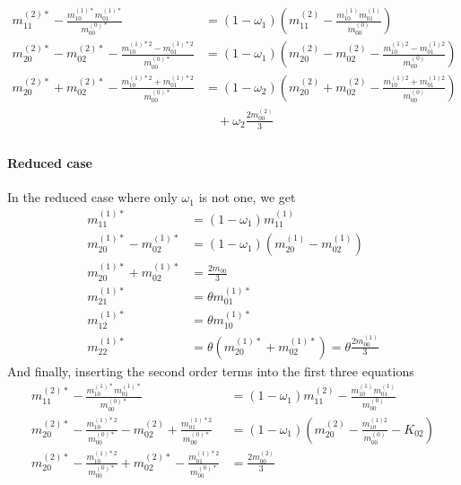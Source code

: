 \begin{equation}
  \begin{aligned}
    m_{11}^{(2)*} - \frac{ m_{10}^{(1)*}m_{01}^{(1)*}}{m_{00}^{(0)*}} & = (1-\omega_1)\left(m_{11}^{(2)} - \frac{ m_{10}^{(1)}m_{01}^{(1)}}{m_{00}^{(0)}}\right) \\
    m_{20}^{(2)*}-m_{02}^{(2)*} - \frac{ m_{10}^{(1)*2} - m_{01}^{(1)*2}}{m_{00}^{(0)*}} & = (1-\omega_1) \left(m_{20}^{(2)}-m_{02}^{(2)} - \frac{ m_{10}^{(1)2} - m_{01}^{(1)2}}{m_{00}^{(0)}}\right) \\
    m_{20}^{(2)*}+m_{02}^{(2)*} - \frac{ m_{10}^{(1)*2} + m_{01}^{(1)*2}}{m_{00}^{(0)*}} & = (1-\omega_2)
    \left(m_{20}^{(2)}+m_{02}^{(2)} - \frac{ m_{10}^{(1)2} + m_{01}^{(1)2}}{m_{00}^{(0)}}\right)
    \\&\quad
    + \omega_2 \frac{2 m_{00}^{(2)}}{3} \\
  \end{aligned}
\end{equation}

\paragraph{Reduced case}
\label{par:Reduced case}
In the reduced case where only $\omega_1$ is not one, we get
\begin{equation}
  \begin{aligned}
    m_{11}^{(1)*} & = (1-\omega_1) m_{11}^{(1)} \\
    m_{20}^{(1)*} - m_{02}^{(1)*}
      & = (1-\omega_1) (m_{20}^{(1)} - m_{02}^{(1)}) \\
    m_{20}^{(1)*} + m_{02}^{(1)*}
      & =  \frac{2 m_{00}}{3} \\
    m_{21}^{(1)*} & = \theta m_{01}^{(1)*} \\
    m_{12}^{(1)*} & = \theta m_{10}^{(1)*} \\
    m_{22}^{(1)*} & = \theta (m_{20}^{(1)*} + m_{02}^{(1)*}) = \theta \frac{2 m_{00}^{(1)}}{3}
  \end{aligned}
\end{equation}
And finally, inserting the second order terms into the first three equations
\begin{equation}
  \begin{aligned}
    m_{11}^{(2)*} - \frac{ m_{10}^{(1)*}m_{01}^{(1)*}}{m_{00}^{(0)*}} & = (1-\omega_1)m_{11}^{(2)} - \frac{ m_{10}^{(1)}m_{01}^{(1)}}{m_{00}^{(0)}} \\
    m_{20}^{(2)*} - \frac{ m_{10}^{(1)*2}}{m_{00}^{(0)*}} - m_{02}^{(2)} + \frac{ m_{01}^{(1)*2}}{m_{00}^{(0)*}}
      & = (1-\omega_1) (m_{20}^{(2)} - \frac{ m_{10}^{(1)2}}{m_{00}^{(0)}} - K_{02}) \\
    m_{20}^{(2)*} - \frac{ m_{10}^{(1)*2}}{m_{00}^{(0)*}} + m_{02}^{(2)*} - \frac{ m_{01}^{(1)*2}}{m_{00}^{(0)*}}
      & =  \frac{2 m_{00}^{(2)}}{3} \\
  \end{aligned}
\end{equation}

